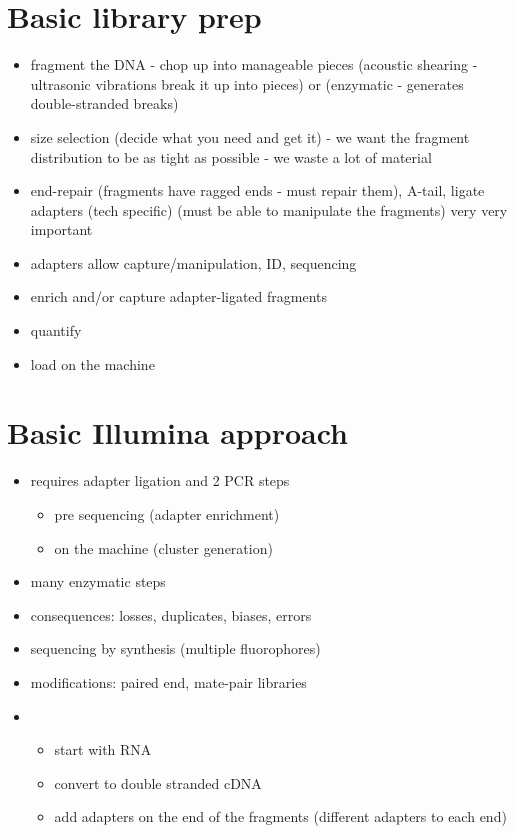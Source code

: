 \documentclass{article}
\begin{document}
    \section{Basic library prep}
        \begin{itemize}
            \item fragment the DNA - chop up into manageable pieces (acoustic shearing - ultrasonic vibrations break it up into pieces) or (enzymatic - generates double-stranded breaks)
            \item size selection (decide what you need and get it) - we want the fragment distribution to be as tight as possible - we waste a lot of material
            \item end-repair (fragments have ragged ends - must repair them), A-tail, ligate adapters (tech specific) (must be able to manipulate the fragments) very very important
            \item adapters allow capture/manipulation, ID, sequencing
            \item enrich and/or capture adapter-ligated fragments
            \item quantify
            \item load on the machine
        \end{itemize}

    \section{Basic Illumina approach}
        \begin{itemize}
            \item requires adapter ligation and 2 PCR steps
            \begin{itemize}
                \item pre sequencing (adapter enrichment)
                \item on the machine (cluster generation)
            \end{itemize}
            \item many enzymatic steps
            \item consequences: losses, duplicates, biases, errors
            \item sequencing by synthesis (multiple fluorophores)
            \item modifications: paired end, mate-pair libraries
            \item 
            \begin{itemize}
                \item start with RNA
                \item convert to double stranded cDNA
                \item add adapters on the end of the fragments (different adapters to each end)
            \end{itemize}
        \end{itemize}
\end{document}
